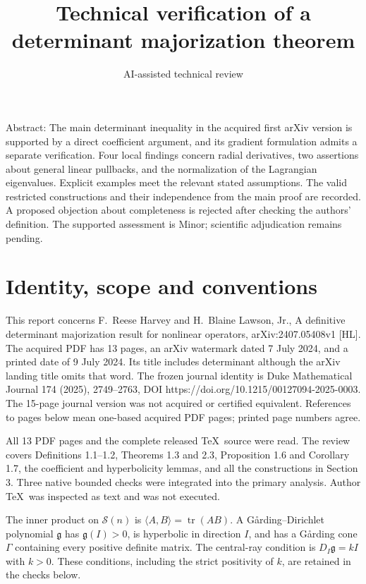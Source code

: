\documentclass[10pt]{article}
\title{Technical verification of
a determinant majorization theorem}
\author{AI-assisted technical review}
\date{}
\begin{document}
\maketitle
Abstract: The main determinant inequality in the acquired first arXiv version is supported by a direct coefficient argument, and its gradient formulation admits a separate verification. Four local findings concern radial derivatives, two assertions about general linear pullbacks, and the normalization of the Lagrangian eigenvalues. Explicit examples meet the relevant stated assumptions. The valid restricted constructions and their independence from the main proof are recorded. A proposed objection about completeness is rejected after checking the authors’ definition. The supported assessment is Minor; scientific adjudication remains pending.\par
\section*{Identity, scope and conventions}
This report concerns F. Reese Harvey and H. Blaine Lawson, Jr., A definitive determinant majorization result for nonlinear operators, arXiv:2407.05408v1 [HL]. The acquired PDF has 13 pages, an arXiv watermark dated 7 July 2024, and a printed date of 9 July 2024. Its title includes determinant although the arXiv landing title omits that word. The frozen journal identity is Duke Mathematical Journal 174 (2025), 2749–2763, DOI https://doi.org/10.1215/00127094-2025-0003. The 15-page journal version was not acquired or certified equivalent. References to pages below mean one-based acquired PDF pages; printed page numbers agree.\par
All 13 PDF pages and the complete released TeX source were read. The review covers Definitions 1.1–1.2, Theorems 1.3 and 2.3, Proposition 1.6 and Corollary 1.7, the coefficient and hyperbolicity lemmas, and all the constructions in Section 3. Three native bounded checks were integrated into the primary analysis. Author TeX was inspected as text and was not executed.\par
The inner product on \(\mathcal S(n)\) is \(\langle A,B\rangle=\operatorname{tr}(AB)\). A Gårding–Dirichlet polynomial \(\mathfrak g\) has \(\mathfrak g(I)>0\), is hyperbolic in direction \(I\), and has a Gårding cone \(\Gamma\) containing every positive definite matrix. The central-ray condition is \(D_I\mathfrak g=kI\) with \(k>0\). These conditions, including the strict positivity of \(k\), are retained in the checks below.\par
\end{document}
